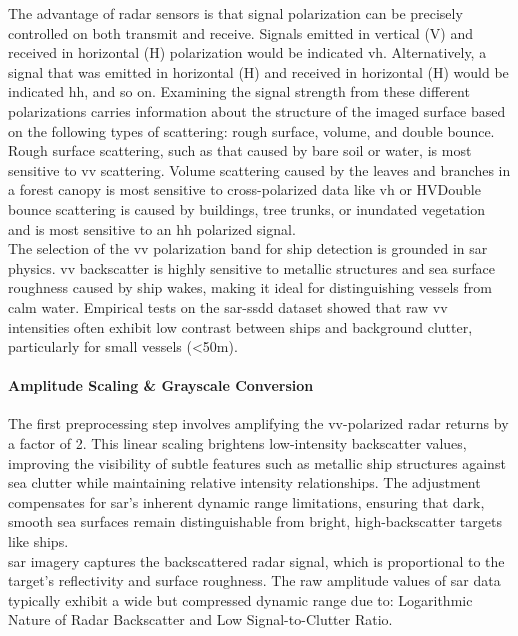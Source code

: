 \documentclass{article}
\begin{document}
The advantage of radar sensors is that signal polarization can be precisely controlled on both transmit and receive. Signals emitted in vertical (V) and received in horizontal (H) polarization would be indicated \acrshort{vh}. Alternatively, a signal that was emitted in horizontal (H) and received in horizontal (H) would be indicated \acrshort{hh}, and so on. Examining the signal strength from these different polarizations carries information about the structure of the imaged surface based on the following types of scattering: rough surface, volume, and double bounce.\\

Rough surface scattering, such as that caused by bare soil or water, is most sensitive to \acrshort{vv} scattering. Volume scattering caused by the leaves and branches in a forest canopy is most sensitive to cross-polarized data like \acrshort{vh} or HVDouble bounce scattering is caused by buildings, tree trunks, or inundated vegetation and is most sensitive to an \acrshort{hh} polarized signal.\\

The selection of the \acrshort{vv} polarization band for ship detection is grounded in \acrshort{sar} physics. \acrshort{vv} backscatter is highly sensitive to metallic structures and sea surface roughness caused by ship wakes, making it ideal for distinguishing vessels from calm water. Empirical tests on the \acrshort{sar}-\acrshort{ssdd} dataset showed that raw \acrshort{vv} intensities often exhibit low contrast between ships and background clutter, particularly for small vessels (<50m). \paragraph{Amplitude Scaling \& Grayscale Conversion}
The first preprocessing step involves amplifying the \acrshort{vv}-polarized radar returns by a factor of 2. This linear scaling brightens low-intensity backscatter values, improving the visibility of subtle features such as metallic ship structures against sea clutter while maintaining relative intensity relationships. The adjustment compensates for \acrshort{sar}’s inherent dynamic range limitations, ensuring that dark, smooth sea surfaces remain distinguishable from bright, high-backscatter targets like ships.\\

\acrshort{sar} imagery captures the backscattered radar signal, which is proportional to the target’s reflectivity and surface roughness. The raw amplitude values of \acrshort{sar} data typically exhibit a wide but compressed dynamic range due to: Logarithmic Nature of Radar Backscatter and Low Signal-to-Clutter Ratio.\\
\end{document}

